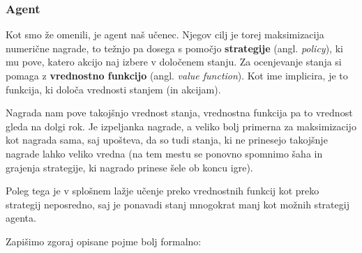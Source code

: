 \documentclass[12pt,a4paper]{amsart}
\theoremstyle{definition} %
\theoremstyle{plain} %
\begin{document}
\subsubsection{Agent}
Kot smo že omenili, je agent naš učenec. Njegov cilj je torej maksimizacija numerične 
nagrade, to težnjo pa dosega s pomočjo \textbf{strategije} (angl. \textit{policy}), ki mu pove, 
katero akcijo naj izbere v določenem stanju. Za ocenjevanje stanja si pomaga z \textbf{vrednostno 
funkcijo} (angl. \textit{value function}). Kot ime implicira, je to funkcija, ki določa vrednosti 
stanjem (in akcijam). 

Nagrada nam pove takojšnjo vrednost stanja, vrednostna funkcija pa to vrednost gleda na dolgi
rok. Je izpeljanka nagrade, a veliko bolj primerna za maksimizacijo kot nagrada sama, saj upošteva,
da so tudi stanja, ki ne prinesejo takojšnje nagrade lahko veliko vredna (na tem mestu se ponovno 
spomnimo šaha in grajenja strategije, ki nagrado prinese šele ob koncu igre).

Poleg tega je v splošnem lažje učenje preko vrednostnih funkcij kot preko strategij neposredno, 
saj je ponavadi stanj mnogokrat manj kot možnih strategij agenta.

Zapišimo zgoraj opisane pojme bolj formalno:
\end{document}
